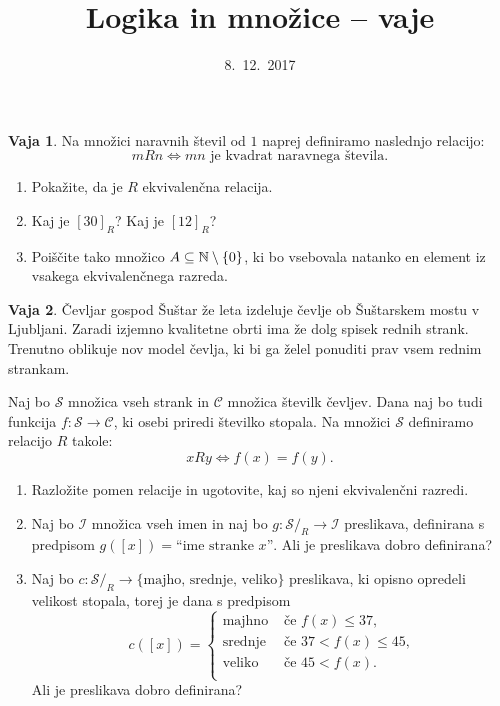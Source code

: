 \documentclass{article}
\newcommand{\NN}{\mathbb{N}}
\theoremstyle{definition}
\newtheorem{vaja}{Vaja}
\begin{document}
\title{Logika in množice -- vaje}
\date{8.~12.~2017}
\maketitle


\begin{vaja}
	Na množici naravnih števil od $1$ naprej definiramo naslednjo relacijo:
	\[m R n \iff \text{$m n$ je kvadrat naravnega števila}.\]
	\begin{enumerate}
		\item
		Pokažite, da je $R$ ekvivalenčna relacija.
		\item
		Kaj je $[30]_R$? Kaj je $[12]_R$?
		\item
		Poiščite tako množico $A \subseteq \NN \setminus \set{0}$, ki bo vsebovala natanko en element iz vsakega ekvivalenčnega razreda.
	\end{enumerate}
\end{vaja}

\begin{vaja}
	Čevljar gospod Šuštar že leta izdeluje čevlje ob Šuštarskem mostu v Ljubljani. Zaradi izjemno kvalitetne obrti ima že dolg spisek rednih strank. Trenutno oblikuje nov model čevlja, ki bi ga želel ponuditi prav vsem rednim strankam.
	
  Naj bo $\mathcal{S}$ množica vseh strank in $\mathcal{C}$ množica številk čevljev. Dana naj bo tudi funkcija $f\colon \mathcal{S} \to \mathcal{C}$, ki osebi priredi številko stopala. Na množici $\mathcal{S}$ definiramo relacijo $R$ takole:
  \begin{equation*}
    x R y \iff f(x) = f(y).
  \end{equation*}
  \begin{enumerate}
  	\item  Razložite pomen relacije in ugotovite, kaj so njeni ekvivalenčni razredi.
  	\item Naj bo $\mathcal{I}$ množica vseh imen in naj bo $g \colon \mathcal{S} / _R \to \mathcal{I} $ preslikava, definirana s predpisom $g([x]) = \text{“ime stranke $x$”}$. Ali je preslikava dobro definirana?
  	\item Naj bo $c \colon \mathcal{S} / _R \to \{\text{majho, srednje, veliko}\}$ preslikava, ki opisno opredeli velikost stopala, torej je dana s predpisom
  	\begin{equation*}
  	c([x]) = 
  	\begin{cases}
  	\text{majhno} & \text{ če $f(x) \leq 37$,} \\
  	\text{srednje} & \text{ če $37 < f(x) \leq 45$,} \\
  	\text{veliko} & \text{ če $45 < f(x)$.} \\
  	\end{cases}
  	\end{equation*}
  	Ali je preslikava dobro definirana?
  \end{enumerate}
\end{vaja}
\end{document}
